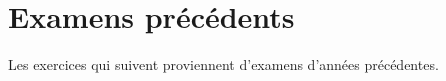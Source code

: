 \section{Examens précédents}

Les exercices qui suivent proviennent d'examens d'années précédentes.

